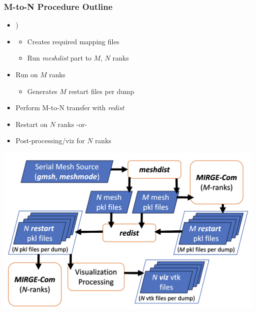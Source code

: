 \begin{frame}\frametitle{M-to-N Procedure Outline}
\begin{minipage}{0.49\textwidth}
\begin{itemize}
\item {)}
\item {\color{lightgray}{Create the target decompositions $M$,$N$}}
  \begin{itemize}
  \color{lightgray}
  \item Creates required mapping files
  \item Run \textit{meshdist} part to $M$, $N$ ranks
  \end{itemize}
\item Run \mirgecom{} on $M$ ranks
\begin{itemize}
\item Generates $M$ restart files per dump
\end{itemize}
\color{lightgray}
\item Perform M-to-N transfer with \textit{redist}
\item Restart \mirgecom{} on $N$ ranks -or-
\item Post-processing/viz for $N$ ranks
\end{itemize}
\end{minipage}
\hfill
\begin{minipage}{.49\textwidth}
\includegraphics[width=\textwidth]{Figures/mtc/redist_data_flow_full.png}
\end{minipage}
\end{frame}

